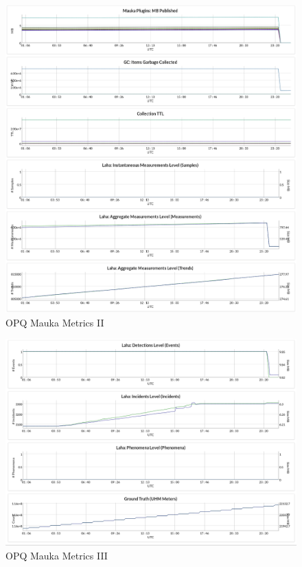 \begin{figure}
	\centering
	\includegraphics[width=\linewidth]{figures/metrics_2.png}
	\caption{OPQ Mauka Metrics II}
	\label{fig:Metrics2}
\end{figure}

\begin{figure}
	\centering
	\includegraphics[width=\linewidth]{figures/metrics_3.png}
	\caption{OPQ Mauka Metrics III}
	\label{fig:Metrics3}
\end{figure}

